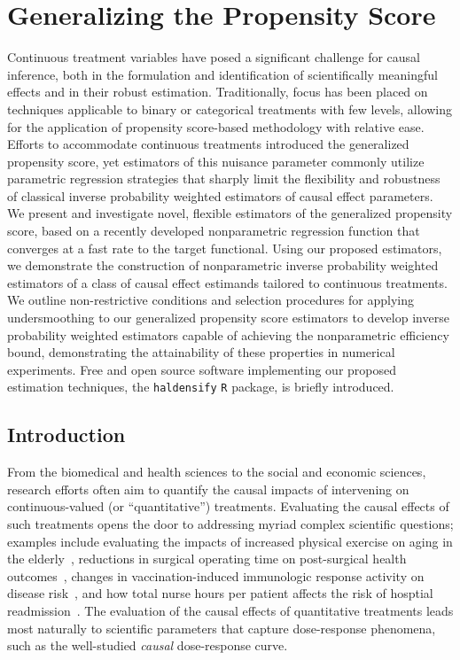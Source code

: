 \chapter{Generalizing the Propensity Score}

Continuous treatment variables have posed a significant challenge for causal
inference, both in the formulation and identification of scientifically
meaningful effects and in their robust estimation. Traditionally, focus has been
placed on techniques applicable to binary or categorical treatments with few
levels, allowing for the application of propensity score-based methodology with
relative ease. Efforts to accommodate continuous treatments introduced the
generalized propensity score, yet estimators of this nuisance parameter commonly
utilize parametric regression strategies that sharply limit the flexibility and
robustness of classical inverse probability weighted estimators of causal effect
parameters. We present and investigate novel, flexible estimators of the
generalized propensity score, based on a recently developed nonparametric
regression function that converges at a fast rate to the target functional.
Using our proposed estimators, we demonstrate the construction of nonparametric
inverse probability weighted estimators of a class of causal effect estimands
tailored to continuous treatments. We outline non-restrictive conditions and
selection procedures for applying undersmoothing to our generalized propensity
score estimators to develop inverse probability weighted estimators capable of
achieving the nonparametric efficiency bound, demonstrating the attainability of
these properties in numerical experiments. Free and open source software
implementing our proposed estimation techniques, the \texttt{haldensify}
\texttt{R} package, is briefly introduced.

\section{Introduction}\label{intro}

From the biomedical and health sciences to the social and economic sciences,
research efforts often aim to quantify the causal impacts of intervening on
continuous-valued (or ``quantitative'') treatments. Evaluating the causal
effects of such treatments opens the door to addressing myriad complex
scientific questions; examples include evaluating the impacts of increased
physical exercise on aging in the elderly~\citep{diaz2012population}, reductions
in surgical operating time on post-surgical health
outcomes~\citep{haneuse2013estimation}, changes in vaccination-induced
immunologic response activity on disease risk~\citep{hejazi2020efficient}, and
how total nurse hours per patient affects the risk of hosptial
readmission~\citep{mchugh2013hospitals}. The evaluation of the causal effects of
quantitative treatments leads most naturally to scientific parameters that
capture dose-response phenomena, such as the well-studied \textit{causal}
dose-response curve.

